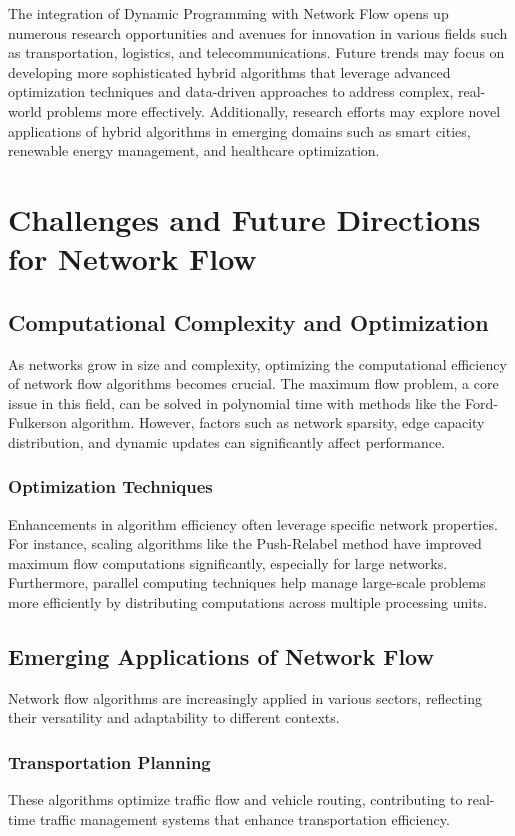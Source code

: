 \documentclass[12pt]{book} %
\begin{document}
The integration of Dynamic Programming with Network Flow opens up numerous research opportunities and avenues for innovation in various fields such as transportation, logistics, and telecommunications. Future trends may focus on developing more sophisticated hybrid algorithms that leverage advanced optimization techniques and data-driven approaches to address complex, real-world problems more effectively. Additionally, research efforts may explore novel applications of hybrid algorithms in emerging domains such as smart cities, renewable energy management, and healthcare optimization.


\section{Challenges and Future Directions for Network Flow}

\subsection{Computational Complexity and Optimization}
As networks grow in size and complexity, optimizing the computational efficiency of network flow algorithms becomes crucial. The maximum flow problem, a core issue in this field, can be solved in polynomial time with methods like the Ford-Fulkerson algorithm. However, factors such as network sparsity, edge capacity distribution, and dynamic updates can significantly affect performance.

\subsubsection{Optimization Techniques}
Enhancements in algorithm efficiency often leverage specific network properties. For instance, scaling algorithms like the Push-Relabel method have improved maximum flow computations significantly, especially for large networks. Furthermore, parallel computing techniques help manage large-scale problems more efficiently by distributing computations across multiple processing units.

\subsection{Emerging Applications of Network Flow}
Network flow algorithms are increasingly applied in various sectors, reflecting their versatility and adaptability to different contexts.

\subsubsection{Transportation Planning}
These algorithms optimize traffic flow and vehicle routing, contributing to real-time traffic management systems that enhance transportation efficiency.
\end{document}
